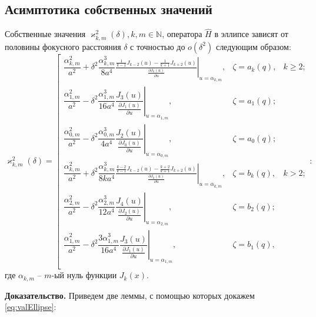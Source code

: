 \subsection{Асимптотика собственных значений}\label{sec:ch2/sec2/subs2}
\begin{theorem}
Собственные значения $\varkappa^2_{k,m}(\delta), k, m \in \mathbb{N}$, оператора $\hat{H}$ в эллипсе зависят от половины фокусного расстояния $\delta$ с точностью до $o(\delta^2)$ следующим образом:
{
\begin{equation}
\varkappa^2_{k,m}(\delta) = \left[
\begin{array}{ccc}
\dfrac{\alpha_{k, m}^2}{a^2} +  \delta^2 
\dfrac{\alpha_{k, m}^3}{8 a^4}
\left. \frac{\frac{1}{k-1} J_{k-2}(u) - \frac{1}{k+1}J_{k+2}(u)}{\frac{\partial J_{k} (u)}{\partial u}}\right|_{u=\alpha_{k, m}} , 
 & \zeta = a_k(q), & k \geq 2; \\
\dfrac{\alpha_{1, m}^2}{a^2} -  \delta^2 \dfrac{\alpha_{1, m}^3}{16 a^4}\left.\dfrac{J_{3}(u)}{\frac{\partial J_{1} (u)}{\partial u}}\right|_{u=\alpha_{1, m}}, & \zeta = a_1(q); \\
\dfrac{\alpha_{0, m}^2}{a^2} -  \delta^2 \dfrac{\alpha_{0, m}^3}{4 a^4}\left.\dfrac{J_{2}(u)}{\frac{\partial J_{0} (u)}{\partial u}}\right|_{u=\alpha_{0, m}},
 & \zeta = a_0(q); \\
\dfrac{\alpha_{k, m}^2}{a^2} +  \delta^2 
\dfrac{\alpha_{k, m}^3}{8 k a^4}
\left.\frac{\frac{k-2}{k-1} J_{k-2}(u) - \frac{k+2}{k+1} J_{k+2}(u)}{\frac{\partial J_{k} (u)}{\partial u}}\right|_{u=\alpha_{k, m}} , & \zeta = b_k(q), & k > 2; \\
\dfrac{\alpha_{2, m}^2}{a^2} -  \delta^2 \dfrac{\alpha_{2, m}^3}{12 a^4}\left.\dfrac{J_{4}(u)}{\frac{\partial J_{2} (u)}{\partial u}}\right|_{u=\alpha_{2, m}},
 & \zeta = b_2(q); \\
\dfrac{\alpha_{1, m}^2}{a^2} -  \delta^2 \dfrac{3\alpha_{1, m}^3}{16 a^4}\left.\dfrac{ J_{3}(u)}{\frac{\partial J_{1} (u)}{\partial u}}\right|_{u=\alpha_{1, m}},
 & \zeta = b_1(q), \\
\end{array}
\right.
\label{eq:valEllipse}:
\end{equation}
}
где $\alpha_{k, m}$ -- $m$-ый нуль функции $J_k(x)$. 
\label{th:stat4}
\end{theorem}
\textbf{Доказательство.}
Приведем две леммы, с помощью которых докажем \ref{eq:valEllipse}:

